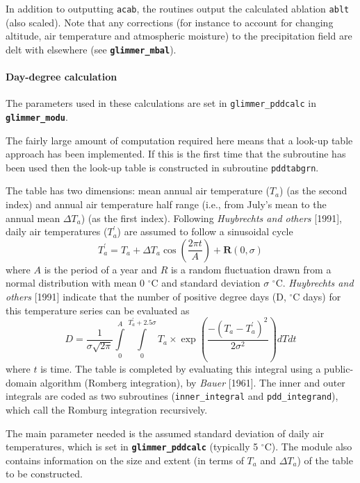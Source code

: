 In addition to outputting \texttt{acab}, the routines output the
calculated ablation \texttt{ablt} (also scaled).  Note that any
corrections (for instance to account for changing altitude, air
temperature and atmospheric moisture) to the precipitation field
are delt with elsewhere (see \texttt{\textbf{glimmer\_mbal}}).

\paragraph{Day-degree calculation}
The parameters used in these calculations are set in
\texttt{glimmer\_pddcalc} in \textbf{\texttt{glimmer\_modu}}.

The fairly large amount of computation required here means that a
look-up table approach has been implemented.  If this is the first
time that the subroutine has been used then the look-up table is
constructed in subroutine \texttt{pddtabgrn}.

The table has two dimensions: mean annual air temperature ($T_a$)
(as the second index) and annual air temperature half range (i.e.,
from July's mean to the annual mean $\Delta T_a$) (as the first
index).  Following \emph{Huybrechts and others} [1991], daily air
temperatures ($T_a^\prime$) are assumed to follow a sinusoidal
cycle
\begin{equation}
    T_a^\prime = T_a + \Delta T_a \cos \left( \frac{2 \pi t}{A}
    \right) + \textbf{R}(0,\sigma)
\end{equation}
where $A$ is the period of a year and $R$ is a random fluctuation
drawn from a normal distribution with mean 0 $^\circ$C and
standard deviation $\sigma$ $^\circ$C. \emph{Huybrechts and
others} [1991] indicate that the number of positive degree days
(D, $^\circ$C days) for this temperature series can be evaluated
as
\begin{equation}\label{pdd}
    D = \frac{1}{\sigma \sqrt{2 \pi}}
    \int\limits_0^A
    \int\limits_0^{T_a^\prime+2.5\sigma}
    T_a \times \exp \left( \frac{-(T_a-T_a^\prime)^2}{2 \sigma^2} \right) dT
    dt
\end{equation}
where $t$ is time.  The table is completed by evaluating this integral using a
public-domain algorithm (Romberg integration), by {\it Bauer} [1961]. The
inner and outer integrals are coded as two subroutines
(\texttt{inner\_integral} and \texttt{pdd\_integrand}), which call the Romburg
integration recursively.

The main parameter needed is the assumed standard deviation of
daily air temperatures, which is set in
\textbf{\texttt{glimmer\_pddcalc}} (typically 5 $^\circ $C).  The
module also contains information on the size and extent (in terms
of $T_a$ and $\Delta T_a$) of the table to be constructed.

